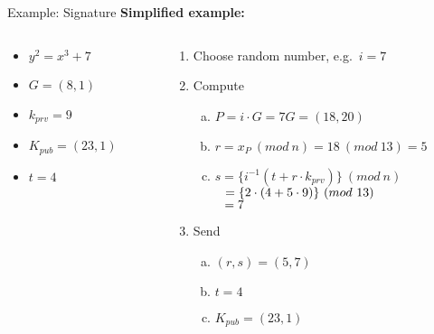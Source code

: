 \documentclass[handout]{beamer}
\begin{document}
\begin{frame}{Example: Signature}
	\textbf{Simplified example:}\\
	\begin{columns}[T]
		\begin{column}{0.3\textwidth}
			\begin{itemize}
				\item $y^2 = x^3 + 7$
				\item $G = (8, 1)$
				\item $k_{prv} = 9$
				\item $K_{pub} = (23, 1)$
				\item $t = 4$
			\end{itemize}
		\end{column}
		\begin{column}{0.7\textwidth}
			\begin{enumerate}
				\item<2-> Choose random number, e.g.\ $i = 7$
				\item<3-> Compute
				\begin{enumerate}[a.]
					\item<3-> $P = i \cdot G = 7G = (18,20)$\\
						\vspace{0.5em}
					\item<4-> $r = x_P\ (mod\ n) = 18\ (mod\ 13) = 5$\\
						\vspace{0.5em}
					\item<5-> $s = \{i^{-1} (t + r \cdot k_{prv})\}\ (mod\ n)$\\
						$\hphantom{s } = \{2 \cdot (4 + 5 \cdot 9)\}\ (mod\ 13)$\\
						$\hphantom{s } = 7$
				\end{enumerate}
				\item<6-> Send
				\begin{enumerate}[a.]
					\item<6-> $(r, s) = (5, 7)$\\
					\vspace{0.5em}
					\item<7-> $t = 4$\\
					\vspace{0.5em}
					\item<8-> $K_{pub} = (23, 1)$\\
					\vspace{0.5em}
				\end{enumerate}
			\end{enumerate}
		\end{column}
	\end{columns}
\end{frame}
\end{document}
